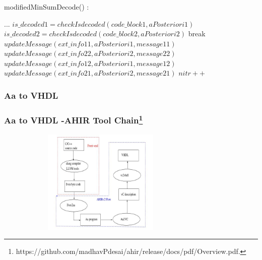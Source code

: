 \documentclass[xcolor=dvipsname]
{beamer}
\begin{document}
\begin{frame}[t]
\frametitle{  }                                 %
\alert{ modifiedMinSumDecode()	: }
\begin{algorithmic}   
\STATE ...  
\STATE$is\_decoded1 = checkIsdecoded( code\_block1 , aPosteriori1 ) $
\STATE$is\_decoded2 = checkIsdecoded( code\_block2 , aPosteriori2 ) $              
        	\STATE break 
    	\ELSE
        	\STATE $updateMessage(ext\_info11 ,aPosteriori1 ,message11)$
        	\STATE $updateMessage(ext\_info22 ,aPosteriori2 ,message22)$
        	\STATE $updateMessage(ext\_info12 ,aPosteriori1 ,message12)$
        	\STATE $updateMessage(ext\_info21 ,aPosteriori2 ,message21)$
     	\ENDIF 
\STATE $nitr++$  
 \ENDWHILE     		
\end{algorithmic}
\end{frame}


\subsubsection{Aa to VHDL}
\begin{frame}[t]
\frametitle{Aa to VHDL -AHIR Tool Chain\footnote{https://github.com/madhavPdesai/ahir/release/docs/pdf/Overview.pdf.} }  
\pause
\begin{figure}
       \includegraphics[height=5cm,width=8cm]{aa2vhdl}
       \end{figure}
\end{frame}

\end{document}
